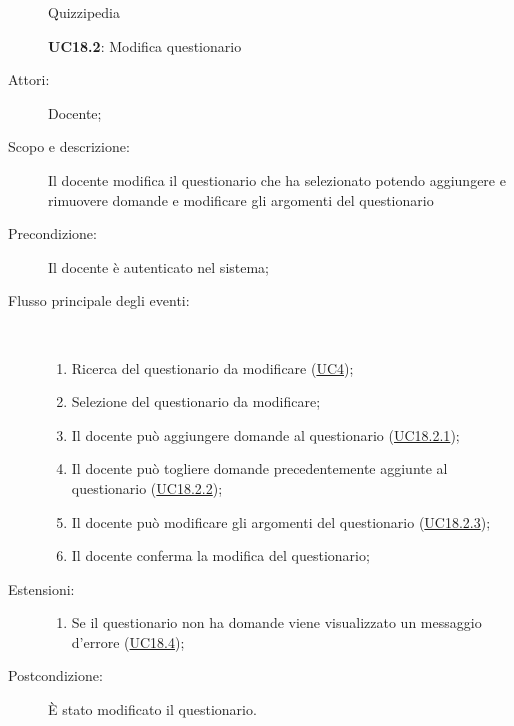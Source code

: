 \begin{figure}[H]
	\centering
	\begin{resizedtikzpicture}{\textwidth}
		\begin{umlsystem}[x=0, fill=lightgray!20]{Quizzipedia}
		\end{umlsystem}
	\end{resizedtikzpicture}
	\caption{\textbf{UC18.2}: Modifica questionario}
	\label{UC18.2}
\end{figure}
\begin{description}
	\item[Attori:] Docente;
	\item[Scopo e descrizione:] Il docente modifica il questionario che ha selezionato potendo aggiungere e rimuovere domande e modificare gli argomenti del questionario
	\item[Precondizione:] Il docente è autenticato nel sistema;
	
	\item[Flusso principale degli eventi:] \ 
	\begin{enumerate}
		\item Ricerca del questionario da modificare (\hyperlink{UC4}{UC4});
		\item Selezione del questionario da modificare;
		\item Il docente può aggiungere domande al questionario (\hyperlink{UC18.2.1}{UC18.2.1});
		\item Il docente può togliere domande precedentemente aggiunte al questionario (\hyperlink{UC18.2.2}{UC18.2.2});
		\item Il docente può modificare gli argomenti del questionario (\hyperlink{UC18.2.3}{UC18.2.3});
		\item Il docente conferma la modifica del questionario;
		
	\end{enumerate}
	\item[Estensioni:]
	\begin{enumerate}
		\item Se il questionario non ha domande viene visualizzato un messaggio d'errore (\hyperlink{UC18.4}{UC18.4});
		
	\end{enumerate}
	\item[Postcondizione:] È stato modificato il questionario.
\end{description}
\hypertarget{UC18.2.1}{}
